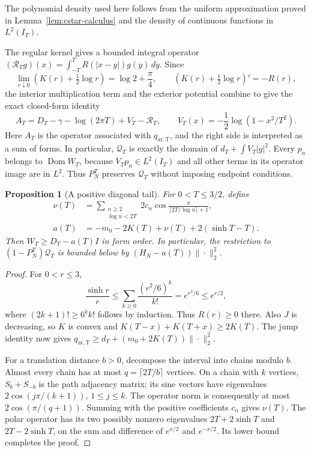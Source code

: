 \documentclass[11pt]{article}
\newtheorem{proposition}[theorem]{Proposition}
\theoremstyle{definition}
\theoremstyle{remark}
\numberwithin{equation}{section}
\begin{document}
The polynomial density used here follows from the uniform approximation
proved in Lemma~\ref{lem:cstar-calculus} and the density of continuous
functions in $L^2(I_T)$.

The regular kernel gives a bounded integral operator
$(\mathcal R_Tg)(x)=\int_{-T}^T R(|x-y|)g(y)\,dy$.
Since
\[
 \lim_{r\downarrow0}\left(K(r)+\tfrac12\log r\right)
   =\log2+\frac\pi4,
 \qquad \left(K(r)+\tfrac12\log r\right)'=-R(r),
\]
the interior multiplication term and the exterior potential combine
to give the exact closed-form identity
\begin{equation}
 A_T=D_T-\gamma-\log(2\pi T)+V_T-\mathcal R_T,
 \qquad V_T(x)=-\frac12\log(1-x^2/T^2).
 \label{eq:window-arch-identity}
\end{equation}
Here $A_T$ is the operator associated with $q_{\mathrm{ar,T}}$, and
the right side is interpreted as a sum of forms.  In particular,
$\mathcal Q_T$ is exactly the domain of
$d_T+\int V_T|g|^2$.  Every $p_n$ belongs to
$\operatorname{Dom}W_T$, because $V_Tp_n\in L^2(I_T)$ and all
other terms in its operator image are in $L^2$.  Thus $P_N^T$
preserves $\mathcal Q_T$ without imposing endpoint conditions.

\begin{proposition}[A positive diagonal tail]
\label{prop:window-legendre-lower}
For $0<T\le3/2$, define
\begin{align}
 \nu(T)&=\sum_{\substack{n\ge2\\\log n<2T}}
        2c_n\cos\frac{\pi}{\lceil2T/\log n\rceil+1},\nonumber\\
 a(T)&=-m_0-2K(T)+\nu(T)+2(\sinh T-T).
 \label{eq:window-lower-constant}
\end{align}
Then $W_T\ge D_T-a(T)I$ in form order.  In particular, the
restriction to $(1-P_N^T)\mathcal Q_T$ is bounded below by
$(H_N-a(T))\|\cdot\|_2^2$.
\end{proposition}
\begin{proof}
For $0<r\le3$,
\[
 \frac{\sinh r}{r}
  \le\sum_{k\ge0}\frac{(r^2/6)^k}{k!}
  =e^{r^2/6}\le e^{r/2},
\]
where $(2k+1)!\ge6^kk!$ follows by induction.  Thus $R(r)\ge0$
there.  Also $J$ is decreasing, so $K$ is convex and
$K(T-x)+K(T+x)\ge2K(T)$.  The jump identity now gives
$q_{\mathrm{ar,T}}\ge d_T+(m_0+2K(T))\|\cdot\|_2^2$.

For a translation distance $b>0$, decompose the interval into
chains modulo $b$.  Almost every chain has at most
$q=\lceil2T/b\rceil$ vertices.  On a chain with $k$ vertices,
$S_b+S_{-b}$ is the path adjacency matrix; its sine vectors have
eigenvalues $2\cos(j\pi/(k+1))$, $1\le j\le k$.
The operator norm is consequently at most $2\cos(\pi/(q+1))$.
Summing with the positive coefficients $c_n$ gives $\nu(T)$.
The polar operator has its two possibly nonzero eigenvalues
$2T+2\sinh T$ and $2T-2\sinh T$, on the sum and difference
of $e^{x/2}$ and $e^{-x/2}$.  Its lower bound completes the proof.
\end{proof}
\end{document}
